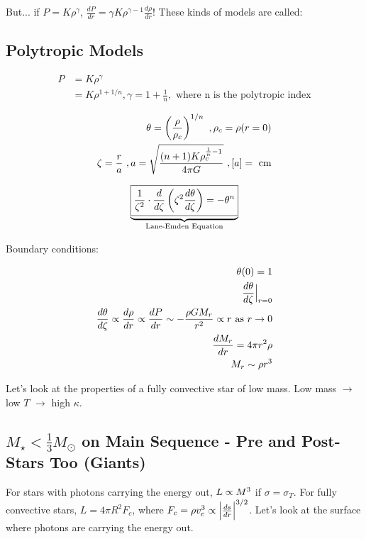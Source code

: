 But... if $P = K \rho^\gamma$, $\frac{dP}{dr} = \gamma K \rho^{\gamma-1} \frac{d\rho}{dr}$! These kinds of models are called:

\subsection{Polytropic Models}

\begin{align}
P &= K\rho^\gamma\\
&= K \rho^{1 + 1/n}, \gamma = 1 + \frac{1}{n}, \text{ where n is the polytropic index}
\end{align}

\begin{align}
\theta = \left( \frac{\rho}{\rho_c} \right) ^{1/n}~,\rho_c = \rho(r=0)\\
\zeta = \frac{r}{a}~, a = \sqrt{\frac{(n+1) K \rho_c ^{\frac{1}{n} -1}}{4 \pi G}}~,[a] = \text{ cm}
\end{align}

\begin{align}
\underbrace{\boxed{\frac{1}{\zeta^2} \cdot \frac{d}{d\zeta} \left(  \zeta^2 \frac{d\theta}{d\zeta} \right) = -\theta^n}}_{\text{Lane-Emden Equation}}
\end{align}

Boundary conditions:

\begin{align}
\theta (0) = 1\\
\frac{d \theta}{d \zeta} \Bigl\lvert_{r=0}\\
\frac{d \theta}{d \zeta} \propto \frac{d \rho}{dr} \propto \frac{dP}{dr} \sim -\frac{\rho GM_r}{r^2} \propto r \text{ as } r \rightarrow 0\\
\frac{dM_r}{dr} = 4 \pi r^2 \rho\\
M_r \sim \rho r^3
\end{align}

Let's look at the properties of a fully convective star of low mass. Low mass $\rightarrow$ low $T$ $\rightarrow$ high $\kappa$. 

\subsection{$M_\star < \frac{1}{3} M_\odot$ on Main Sequence - Pre and Post-Stars Too (Giants)}

For stars with photons carrying the energy out, $L \propto M^3$ if $\sigma = \sigma_T$. For fully convective stars, $L = 4 \pi R^2 F_c$, where $F_c = \rho v_c^3 \propto \Bigl\lvert \frac{ds}{dr} \Bigl\lvert^{3/2}$. Let's look at the surface where photons are carrying the energy out. 

